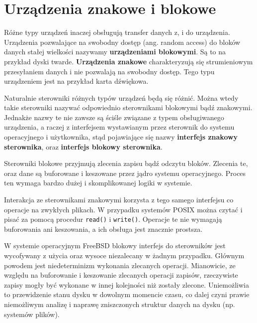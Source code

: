 \documentclass[shortabstract,inz]{iithesis}
\begin{document}
\section{Urządzenia znakowe i blokowe} %

Różne typy urządzeń inaczej obsługują transfer danych z, i do urządzenia.
Urządzenia pozwalające na swobodny dostęp (ang. random access) do bloków danych 
stałej wielkości nazywamy \textbf{urządzeniami blokowymi}. Są to na przykład dyski 
twarde. 
\textbf{Urządzenia znakowe} charakteryzują się strumieniowym przesyłaniem danych i
nie pozwalają na swobodny dostęp. Tego typu urządzeniem jest na przykład karta dźwiękowa.

Naturalnie sterowniki różnych typów urządzeń będą się różnić. Można wtedy takie sterowniki
nazywać odpowiednio sterownikami blokowymi bądź znakowymi. Jednakże nazwy te nie 
zawsze są ściśle związane z typem obsługiwanego urządzenia, a raczej z interfejsem wystawianym
przez sterownik do systemu operacyjnego i użytkownika, stąd pojawiające się nazwy
\textbf{interfejs znakowy sterownika}, oraz \textbf{interfejs blokowy sterownika}.

Sterowniki blokowe przyjmują zlecenia zapisu bądź odczytu bloków. Zlecenia te, oraz dane
są buforowane i keszowane przez jądro systemu operacyjnego. Proces ten wymaga 
bardzo dużej i skomplikowanej logiki w systemie.

Interakcja ze sterownikami znakowymi korzysta z tego samego interfejsu co operacje 
na zwykłych plikach. W przypadku systemów POSIX można czytać i pisać za pomocą procedur 
\texttt{read()} i \texttt{write()}. Operacje te nie wymagają buforowania ani keszowania,
a ich obsługa jest znacznie prostsza.

W systemie operacyjnym FreeBSD blokowy interfejs do sterowników jest wycofywany z użycia oraz 
wysoce niezalecany w żadnym przypadku.
Głównym powodem jest niedeterminizm wykonania zlecanych operacji. Mianowicie, ze względu na
buforowanie i keszowanie zlecanych operacji zapisów, rzeczywiste zapisy mogły być
wykonane w innej kolejności niż zostały zlecone. Uniemożliwia to przewidzenie 
stanu dysku w dowolnym momencie czasu, co dalej czyni prawie niemożliwym 
analizę i naprawę zniszczonych struktur danych na dysku (np. systemów plików).
\end{document}

